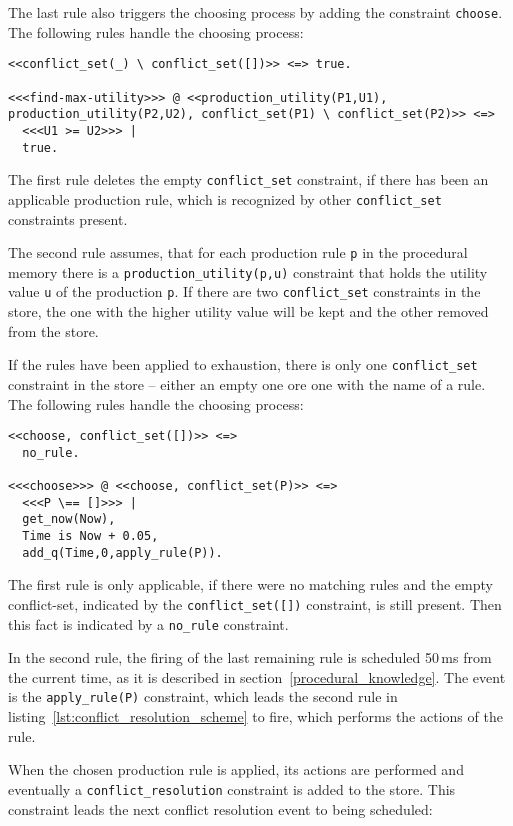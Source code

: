 The last rule also triggers the choosing process by adding the constraint \lstinline|choose|. The following rules handle the choosing process:

\begin{lstlisting}
<<conflict_set(_) \ conflict_set([])>> <=> true.
  
<<<find-max-utility>>> @ <<production_utility(P1,U1), production_utility(P2,U2), conflict_set(P1) \ conflict_set(P2)>> <=>
  <<<U1 >= U2>>> |
  true.
\end{lstlisting}

The first rule deletes the empty \lstinline|conflict_set| constraint, if there has been an applicable production rule, which is recognized by other \lstinline|conflict_set| constraints present. 

The second rule assumes, that for each production rule \lstinline|p| in the procedural memory there is a \lstinline|production_utility(p,u)| constraint that holds the utility value \lstinline|u| of the production \lstinline|p|. If there are two \lstinline|conflict_set| constraints in the store, the one with the higher utility value will be kept and the other removed from the store.

If the rules have been applied to exhaustion, there is only one \lstinline|conflict_set| constraint in the store -- either an empty one ore one with the name of a rule. The following rules handle the choosing process:

\begin{lstlisting}
<<choose, conflict_set([])>> <=>
  no_rule.

<<<choose>>> @ <<choose, conflict_set(P)>> <=>
  <<<P \== []>>> |
  get_now(Now),
  Time is Now + 0.05,
  add_q(Time,0,apply_rule(P)). 
\end{lstlisting}

The first rule is only applicable, if there were no matching rules and the empty conflict-set, indicated by the \lstinline|conflict_set([])| constraint, is still present. Then this fact is indicated by a \lstinline|no_rule| constraint.

In the second rule, the firing of the last remaining rule is scheduled 50\,ms from the current time, as it is described in section~\ref{procedural_knowledge}. The event is the \lstinline|apply_rule(P)| constraint, which leads the second rule in listing~\ref{lst:conflict_resolution_scheme} to fire, which performs the actions of the rule.

When the chosen production rule is applied, its actions are performed and eventually a \lstinline|conflict_resolution| constraint is added to the store. This constraint leads the next conflict resolution event to being scheduled:

